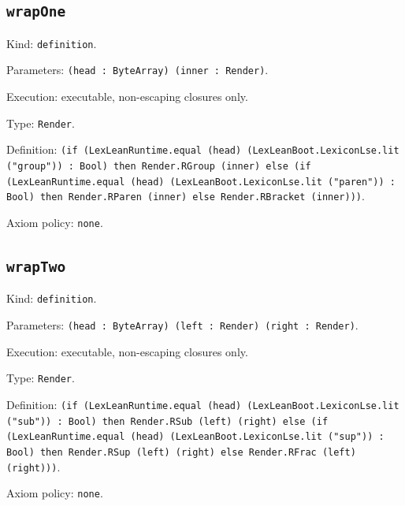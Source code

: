 \documentclass[11pt]{article}
\begin{document}
\subsection*{\texttt{wrapOne}}
\noindent Kind: \texttt{definition}.\par
\noindent Parameters: \texttt{(head : ByteArray) (inner : Render)}.\par
\noindent Execution: executable, non-escaping closures only.\par
\noindent Type: \texttt{Render}.\par
\noindent Definition: \texttt{(if (LexLeanRuntime.equal (head) (LexLeanBoot.LexiconLse.lit ("group")) : Bool) then Render.RGroup (inner) else (if (LexLeanRuntime.equal (head) (LexLeanBoot.LexiconLse.lit ("paren")) : Bool) then Render.RParen (inner) else Render.RBracket (inner)))}.\par
\noindent Axiom policy: \texttt{none}.\par
\subsection*{\texttt{wrapTwo}}
\noindent Kind: \texttt{definition}.\par
\noindent Parameters: \texttt{(head : ByteArray) (left : Render) (right : Render)}.\par
\noindent Execution: executable, non-escaping closures only.\par
\noindent Type: \texttt{Render}.\par
\noindent Definition: \texttt{(if (LexLeanRuntime.equal (head) (LexLeanBoot.LexiconLse.lit ("sub")) : Bool) then Render.RSub (left) (right) else (if (LexLeanRuntime.equal (head) (LexLeanBoot.LexiconLse.lit ("sup")) : Bool) then Render.RSup (left) (right) else Render.RFrac (left) (right)))}.\par
\noindent Axiom policy: \texttt{none}.\par
\end{document}
